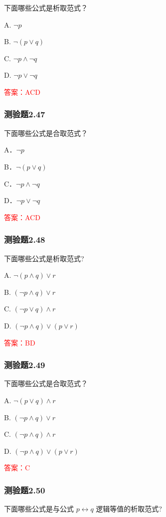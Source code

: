 \documentclass[UTF8, heading=true]{ctexart}
\begin{document}
下面哪些公式是析取范式？

A. $ \neg p$

B. $\neg(p \vee q)$

C. $\neg p \wedge \neg q$

D. $ \neg p \vee \neg q$

\textcolor{red}{答案：ACD}

\subsubsection{测验题2.47}

下面哪些公式是合取范式？

A．$ \neg p$

B．$\neg(p \vee q)$

C．$\neg p \wedge \neg q$

D．$ \neg p \vee \neg q$

\textcolor{red}{答案：ACD}

\subsubsection{测验题2.48}

下面哪些公式是析取范式?

A. $\neg(p \wedge q) \vee r$

B. $(\neg p \wedge q) \vee r$

C. $(\neg p \vee q) \wedge r$

D. $(\neg p \wedge q) \vee(p \vee r)$

\textcolor{red}{答案：BD}


\subsubsection{测验题2.49}

下面哪些公式是合取范式？

A. $ \neg(p \vee q) \wedge r$

B. $(\neg p \wedge q) \vee r$

C. $(\neg p \wedge q) \wedge r$

D. $(\neg p \wedge q) \vee(p \vee r)$

\textcolor{red}{答案：C}

\subsubsection{测验题2.50}

下面哪些公式是与公式 $p \leftrightarrow q$ 逻辑等值的析取范式?
\end{document}
